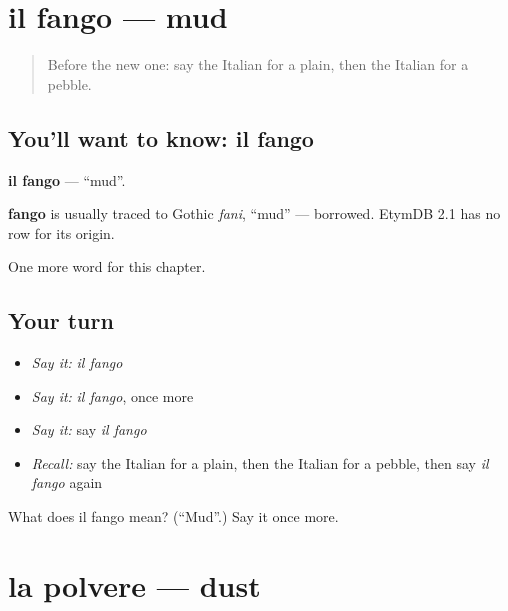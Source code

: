 \section[il fango]{il fango — mud}

\label{lesson:IT-C229-fango}



\begin{quote}
Before the new one: say the Italian for a plain, then the Italian for a pebble.
\end{quote}

\subsection*{You'll want to know: il fango}
\textbf{il fango} — \textquotedblleft{}mud\textquotedblright{}.

\begin{cousinweb}
\textbf{fango} is usually traced to Gothic \emph{fani}, \textquotedblleft{}mud\textquotedblright{} — borrowed. EtymDB 2.1 has no row for its origin.
\end{cousinweb}

\begin{grammarlens}[title={What you've built}]
One more word for this chapter.
\end{grammarlens}

\subsection*{Your turn}
\begin{itemize}
\raggedright
  \item \emph{Say it:} \emph{il fango}
  \item \emph{Say it:} \emph{il fango}, once more
  \item \emph{Say it:} say \emph{il fango}
  \item \emph{Recall:} say the Italian for a plain, then the Italian for a pebble, then say \emph{il fango} again
\end{itemize}

\begin{tcolorbox}[breakable,colback=teal!4,colframe=teal!35!black,title={Before you move on}]
What does il fango mean? (\textquotedblleft{}Mud\textquotedblright{}.) Say it once more.
\end{tcolorbox}
\section[la polvere]{la polvere — dust}

